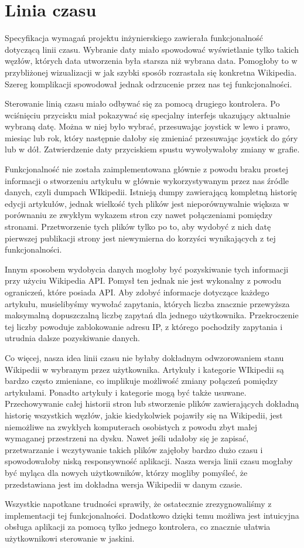 \section{Linia czasu}
Specyfikacja wymagań projektu inżynierskiego zawierała funkcjonalność dotyczącą linii czasu. Wybranie daty miało spowodować wyświetlanie tylko takich węzłów, których data utworzenia była starsza niż wybrana data. Pomogłoby to w przybliżonej wizualizacji w jak szybki sposób rozrastała się konkretna Wikipedia. Szereg komplikacji spowodował jednak odrzucenie przez nas tej funkcjonalności.

Sterowanie linią czasu miało odbywać się za pomocą drugiego kontrolera. Po wciśnięciu przycisku miał pokazywać się specjalny interfejs ukazujący aktualnie wybraną datę. Można w niej było wybrać, przesuwając joystick w lewo i prawo, miesiąc lub rok, który następnie dałoby się zmieniać przesuwając joystick do góry lub w dół. Zatwierdzenie daty przyciskiem spustu wywoływałoby zmiany w grafie. 

Funkcjonalność nie została zaimplementowana głównie z powodu braku prostej informacji o stworzeniu artykułu w głównie wykorzystywanym przez nas źródle danych, czyli dumpach WIkipedii. Istnieją dumpy zawierającą kompletną historię edycji artykułów, jednak wielkość tych plików jest nieporównywalnie większa w porównaniu ze zwykłym wykazem stron czy nawet połączeniami pomiędzy stronami. Przetworzenie tych plików tylko po to, aby wydobyć z nich datę pierwszej publikacji strony jest niewymierna do korzyści wynikających z tej funkcjonalności. 

Innym sposobem wydobycia danych mogłoby być pozyskiwanie tych informacji przy użyciu Wikipedia API. Pomysł ten jednak nie jest wykonalny z powodu ograniczeń, które posiada API. Aby zdobyć informacje dotyczące każdego artykułu, musielibyśmy wywołać zapytania, których liczba znacznie przewyższa maksymalną dopuszczalną liczbę zapytań dla jednego użytkownika. Przekroczenie tej liczby powoduje zablokowanie adresu IP, z którego pochodziły zapytania i utrudnia dalsze pozyskiwanie danych.

Co więcej, nasza idea linii czasu nie byłaby dokładnym odwzorowaniem stanu Wikipedii w wybranym przez użytkownika. Artykuły i kategorie WIkipedii są bardzo często zmieniane, co implikuje możliwość zmiany połączeń pomiędzy artykułami. Ponadto artykuły i kategorie mogą być także usuwane. Przechowywanie całej historii stron lub stworzenie plików zawierających dokładną historię wszystkich węzłów, jakie kiedykolwiek pojawiły się na Wikipedii, jest niemożliwe na zwykłych komputerach osobistych z powodu zbyt małej wymaganej przestrzeni na dysku. Nawet jeśli udałoby się je zapisać, przetwarzanie i wczytywanie takich plików zajęłoby bardzo dużo czasu i spowodowałoby niską responsywność aplikacji. Nasza wersja linii czasu mogłaby być myląca dla nowych użytkowników, którzy mogliby pomyśleć, że przedstawiana jest im dokładna wersja Wikipedii w danym czasie.

Wszystkie napotkane trudności sprawiły, że ostatecznie zrezygnowaliśmy z implementacji tej funkcjonalności. Dodatkowo dzięki temu możliwa jest intuicyjna obsługa aplikacji za pomocą tylko jednego kontrolera, co znacznie ułatwia użytkownikowi sterowanie w jaskini. 


